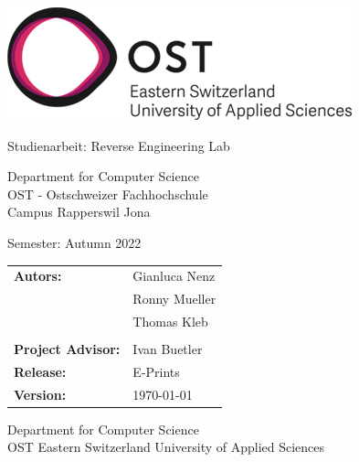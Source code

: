 \begin{titlepage}

    \begin{center}

        \includegraphics[height=0.15\textwidth, right]{resources/ost-logo.png}

        \vspace{2 cm}


        {\Huge Studienarbeit: Reverse Engineering Lab}

         
        \vspace{1.5 cm}

        Department for Computer Science \\
        OST - Ostschweizer Fachhochschule \\
        Campus Rapperswil Jona \\

        \vspace{1 cm}

        Semester: Autumn 2022

        \vspace{1 cm}
        
        \begin{table}[h!]
            \centering
            \begin{tabular}{@{}ll}
                \textbf{Autors:}    & Gianluca Nenz \\
                                          & Ronny Mueller \\
                                          & Thomas Kleb \\
                                          &                    \\
                \textbf{Project Advisor:} & Ivan Buetler \\
                \textbf{Release:} & E-Prints \\
                \textbf{Version:} & \today
            \end{tabular}
        \end{table}
        

        \vfill


        \vspace{1cm}
        Department for Computer Science\\
        OST Eastern Switzerland University of Applied Sciences

    \end{center}

\end{titlepage}

